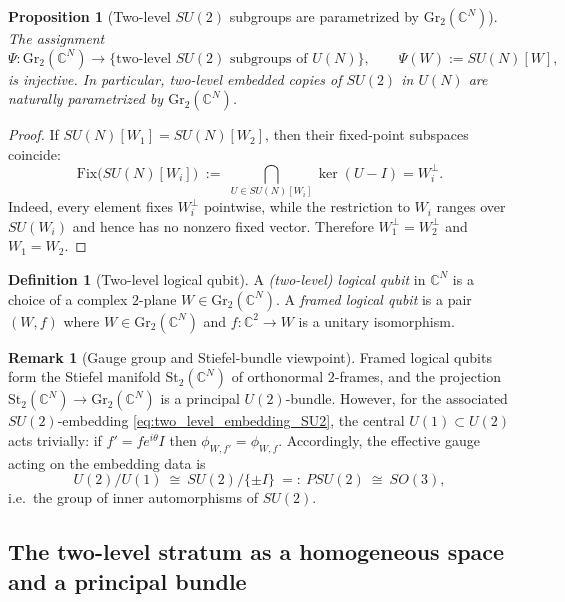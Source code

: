 \documentclass{article}%
\newtheorem{proposition}[theorem]{Proposition}
\theoremstyle{definition}
\newtheorem{definition}[theorem]{Definition}
\newtheorem{remark}[theorem]{Remark}
\numberwithin{equation}{section}
\newcommand{\C}{\mathbb{C}}
\newcommand{\Gr}{\mathrm{Gr}}
\newcommand{\Fix}{\mathrm{Fix}}
\newcommand{\St}{\mathrm{St}}
\begin{document}
\begin{proposition}[Two-level $SU(2)$ subgroups are parametrized by $\Gr_2(\C^N)$]
\label{prop:two_level_param_by_grass}
The assignment
\begin{equation}\label{eq:W_to_subgroup}
\Psi:\Gr_2(\C^N)\longrightarrow \{\text{two-level $SU(2)$ subgroups of }U(N)\},\qquad
\Psi(W):=SU(N)[W],
\end{equation}
is injective. In particular, two-level embedded copies of $SU(2)$ in $U(N)$ are naturally
parametrized by $\Gr_2(\C^N)$.
\end{proposition}

\begin{proof}
If $SU(N)[W_1]=SU(N)[W_2]$, then their fixed-point subspaces coincide:
\[
\Fix\big(SU(N)[W_i]\big)\;:=\;\bigcap_{U\in SU(N)[W_i]}\ker(U-I)=W_i^\perp.
\]
Indeed, every element fixes $W_i^\perp$ pointwise, while the restriction to $W_i$ ranges over
$SU(W_i)$ and hence has no nonzero fixed vector. Therefore $W_1^\perp=W_2^\perp$ and $W_1=W_2$.
\end{proof}

\begin{definition}[Two-level logical qubit]\label{def:logical_qubit}
A \emph{(two-level) logical qubit} in $\C^N$ is a choice of a complex $2$-plane $W\in\Gr_2(\C^N)$.
A \emph{framed logical qubit} is a pair $(W,f)$ where $W\in\Gr_2(\C^N)$ and $f:\C^2\to W$ is a unitary
isomorphism.
\end{definition}

\begin{remark}[Gauge group and Stiefel-bundle viewpoint]\label{rem:gauge_bundle_viewpoint}
Framed logical qubits form the Stiefel manifold $\St_2(\C^N)$ of orthonormal $2$-frames, and the
projection $\St_2(\C^N)\to \Gr_2(\C^N)$ is a principal $U(2)$-bundle. However, for the associated
$SU(2)$-embedding \eqref{eq:two_level_embedding_SU2}, the central $U(1)\subset U(2)$ acts trivially:
if $f'=fe^{i\theta}I$ then $\phi_{W,f'}=\phi_{W,f}$. Accordingly, the effective gauge acting on the
embedding data is
\[
U(2)/U(1)\ \cong\ SU(2)/\{\pm I\}\ =:\ PSU(2)\ \cong\ SO(3),
\]
i.e.\ the group of inner automorphisms of $SU(2)$.
\end{remark}


\subsection{The two-level stratum as a homogeneous space and a principal bundle}
\label{subsec:two_level_stratum_bundle}
\end{document}
